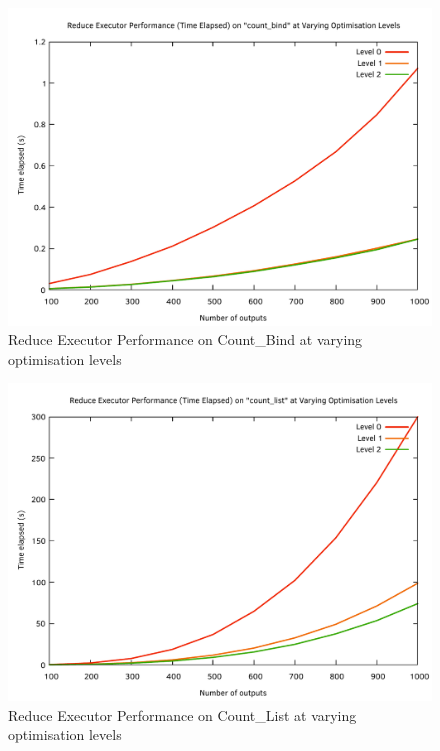 \begin{figure}[htb]
    \centering
    \includegraphics[width=\textwidth - 60pt]{04_results/images/reduce_count_bind_performance}
    \caption{Reduce Executor Performance on Count\_Bind at varying optimisation levels}
    \label{fig:reduce_count_bind_performance}
\end{figure}
\begin{figure}[htb]
    \centering
    \includegraphics[width=\textwidth - 60pt]{04_results/images/reduce_count_list_performance}
    \caption{Reduce Executor Performance on Count\_List at varying optimisation levels}
    \label{fig:reduce_count_list_performance}
\end{figure}
